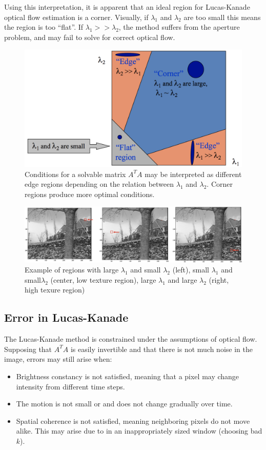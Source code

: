 \documentclass{article}
\begin{document}
Using this interpretation, it is apparent that an ideal region for Lucas-Kanade optical flow estimation is a corner. Visually, if $\lambda_1$ and $\lambda_2$ are too small this means the region is too “flat”.  If $\lambda_1 >> \lambda_2$, the method suffers from the aperture problem, and may fail to solve for correct optical flow.
\begin{figure}[H]
\centering
\includegraphics[width=\textwidth]{lk_eigen.png}
\caption{Conditions for a solvable matrix $A^TA$ may be interpreted as different edge regions depending on the relation between $\lambda_1$ and  $\lambda_2$. Corner regions produce more optimal conditions.}
\end{figure}

\begin{figure}[H]
\centering

\includegraphics[width=\textwidth]{lk_regions.png}
\caption{Example of regions with large $\lambda_1$ and small $\lambda_2$ (left), small $\lambda_1$ and small$\lambda_2$ (center, low texture region), large $\lambda_1$ and large $\lambda_2$ (right, high texure region)}
\end{figure}

\subsection{Error in Lucas-Kanade}
The Lucas-Kanade method is constrained under the assumptions of optical flow. Supposing that $A^TA$ is easily invertible and that there is not much noise in the image, errors may still arise when:
\begin{itemize}
\item Brightness constancy is not satisfied, meaning that a pixel may change intensity from different time steps.
\item The motion is not small or and does not change gradually over time.
\item Spatial coherence is not  satisfied, meaning neighboring pixels do not move alike.
\subitem This may arise due to in an inappropriately sized window (choosing bad $k$).
\end{itemize}
\end{document}
